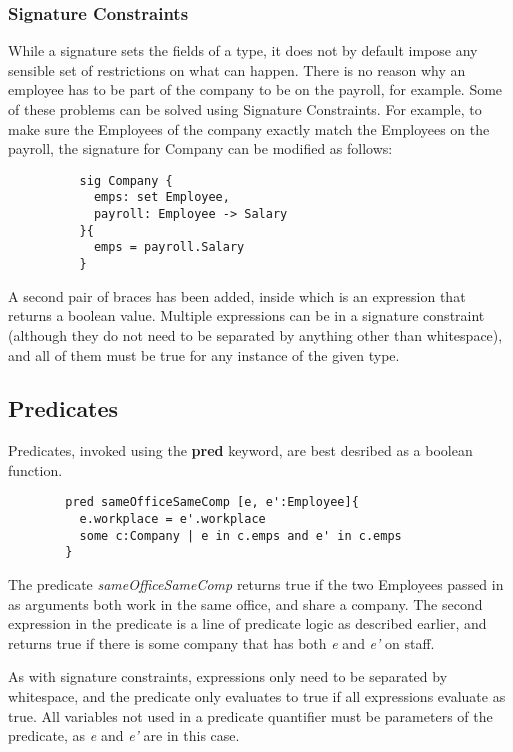 \documentclass[10pt]{article}
\begin{document}
      \subsubsection*{Signature Constraints}
        While a signature sets the fields of a type, it does not by default impose any sensible set of restrictions on what can happen. There is no reason why an employee has to be part of the company to be on the payroll, for example. Some of these problems can be solved using Signature Constraints. For example, to make sure the Employees of the company exactly match the Employees on the payroll, the signature for Company can be modified as follows:
        \begin{verbatim}
          sig Company {
            emps: set Employee,
            payroll: Employee -> Salary
          }{
            emps = payroll.Salary
          }
        \end{verbatim}
        A second pair of braces has been added, inside which is an expression that returns a boolean value. Multiple expressions can be in a signature constraint (although they do not need to be separated by anything other than whitespace), and all of them must be true for any instance of the given type.
    \subsection*{Predicates}
      Predicates, invoked using the \textbf{pred} keyword, are best desribed as a boolean function.
      \begin{verbatim}
        pred sameOfficeSameComp [e, e':Employee]{
          e.workplace = e'.workplace
          some c:Company | e in c.emps and e' in c.emps
        }
      \end{verbatim}
      The predicate \textit{sameOfficeSameComp} returns true if the two Employees passed in as arguments both work in the same office, and share a company. The second expression in the predicate is a line of predicate logic as described earlier, and returns true if there is some company that has both \textit{e} and \textit{e'} on staff.\par
      As with signature constraints, expressions only need to be separated by whitespace, and the predicate only evaluates to true if all expressions evaluate as true. All variables not used in a predicate quantifier must be parameters of the predicate, as \textit{e} and \textit{e'} are in this case.
\end{document}
